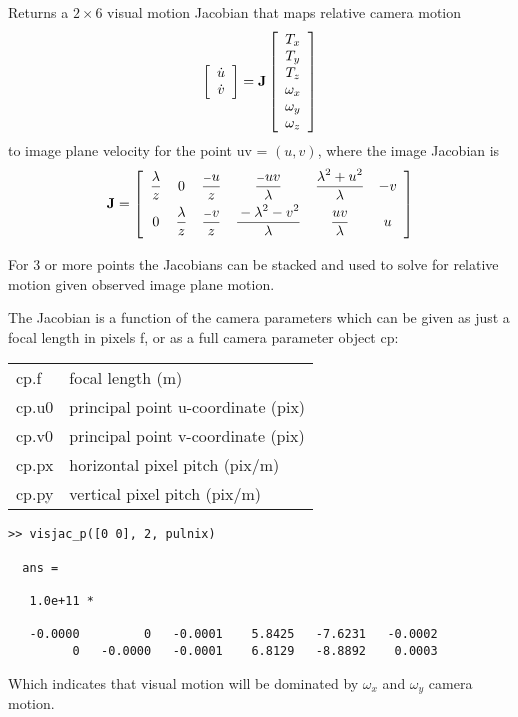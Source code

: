 \documentclass{article}
\def\ds{\displaystyle\strut}
\def\fl{{\lambda}}      %
\newcommand{\mdes}[1]{\hskip -1.25in 
{\hbox{\makebox[1.25in][l]{\Refon Description}}}{#1}\vskip 0.25in}
\newcommand{\mex}[1]{\hskip -1.25in 
{\hbox{\makebox[1.25in][l]{\Refon Examples}}}{#1}\vskip 0.25in}
\newcommand{\var}[1]{{\vtt #1}}
\begin{document}
{{{\mdes{Returns a $2 \times 6$ visual motion Jacobian
that maps relative camera motion 
\[
\left[ \begin{array}{c}
	\dot{u} \\ \dot{v} \end{array} \right] = {\bf J}
\left[ \begin{array}{c} T_{x} \cr T_{y} \cr T_{z} \cr \omega_{x}
 \cr \omega_{y} \cr \omega_{z} \end{array} \right]
\]
to image plane velocity for the point \var{uv} = $(u,v)$, 
where the image Jacobian is
\begin{equation}
{\bf J} =\left[  \begin{array}{cccccc}
   {\ds \fl \over \ds z}  &  0  & - {\ds u} \over {\ds z}  &
           - {\ds u v} \over {\ds \fl}  &
           {\ds \fl^2 + u^2 } \over {\ds \fl} &
           -v \\
   0 &  {\ds \fl \over \ds z} & - {\ds v} \over {\ds z}  &
           {\ds - \fl^2 -  v^2 } \over {\ds \fl} &
           {\ds u v} \over {\ds \fl}  &
           u \\
   \end{array} \right] 
\end{equation}

For 3 or more points the Jacobians can be stacked and used to solve for
relative motion given observed image plane motion.

The Jacobian is a function of the camera parameters which can be given as
just a focal length in pixels \var{f}, or as a full camera parameter
object \var{cp}:

\begin{tabular}{lp{10cm}}
\var{cp.f} & focal length (m) \\
\var{cp.u0} & principal point u-coordinate (pix) \\
\var{cp.v0} & principal point v-coordinate (pix) \\
\var{cp.px} & horizontal pixel pitch (pix/m) \\
\var{cp.py} & vertical pixel pitch (pix/m)
\end{tabular}
}

\mex{}
\begin{verbatim}
>> visjac_p([0 0], 2, pulnix)

  ans =

   1.0e+11 *

   -0.0000         0   -0.0001    5.8425   -7.6231   -0.0002
         0   -0.0000   -0.0001    6.8129   -8.8892    0.0003
\end{verbatim}
Which indicates that visual motion will be dominated by $\omega_x$ and
$\omega_y$ camera motion.

}}}
\end{document}
